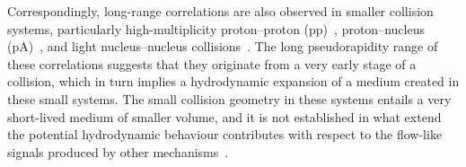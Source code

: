 Correspondingly, long-range correlations are also observed in smaller collision systems, particularly high-multiplicity proton--proton (pp)~\cite{Aad:2015gqa,Khachatryan:2015lva,Khachatryan:2016txc,Acharya:2019vdf}, proton--nucleus (pA)~\cite{Abelev:2012ola,Aad:2014lta,Aaboud:2016yar,Khachatryan:2016ibd}, and light nucleus--nucleus collisions~\cite{PHENIX:2018lia,Aidala:2017ajz}. The long pseudorapidity range of these correlations suggests that they originate from a very early stage of a collision, which in turn implies a hydrodynamic expansion of a medium created in these small systems. The small collision geometry in these systems entails a very short-lived medium of smaller volume, and it is not established in what extend the potential hydrodynamic behaviour contributes with respect to the flow-like signals produced by other mechanisms~\cite{Busza:2018rrf,Nagle:2018nvi}.

